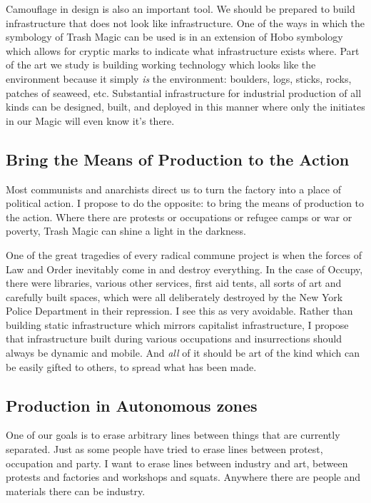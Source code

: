 Camouflage in design is also an important tool. We should be prepared to
build infrastructure that does not look like infrastructure. One of the
ways in which the symbology of Trash Magic can be used is in an
extension of Hobo symbology which allows for cryptic marks to indicate
what infrastructure exists where. Part of the art we study is building
working technology which looks like the environment because it simply
\emph{is} the environment: boulders, logs, sticks, rocks, patches of
seaweed, etc. Substantial infrastructure for industrial production of
all kinds can be designed, built, and deployed in this manner where only
the initiates in our Magic will even know it's there.

\subsection{Bring the Means of Production to the
Action}\label{bring-the-means-of-production-to-the-action}

Most communists and anarchists direct us to turn the factory into a
place of political action. I propose to do the opposite: to bring the
means of production to the action. Where there are protests or
occupations or refugee camps or war or poverty, Trash Magic can shine a
light in the darkness.

One of the great tragedies of every radical commune project is when the
forces of Law and Order inevitably come in and destroy everything. In
the case of Occupy, there were libraries, various other services, first
aid tents, all sorts of art and carefully built spaces, which were all
deliberately destroyed by the New York Police Department in their
repression. I see this as very avoidable. Rather than building static
infrastructure which mirrors capitalist infrastructure, I propose that
infrastructure built during various occupations and insurrections should
always be dynamic and mobile. And \emph{all} of it should be art of the
kind which can be easily gifted to others, to spread what has been made.

\subsection{Production in Autonomous
zones}\label{production-in-autonomous-zones}

One of our goals is to erase arbitrary lines between things that are
currently separated. Just as some people have tried to erase lines
between protest, occupation and party. I want to erase lines between
industry and art, between protests and factories and workshops and
squats. Anywhere there are people and materials there can be industry.

